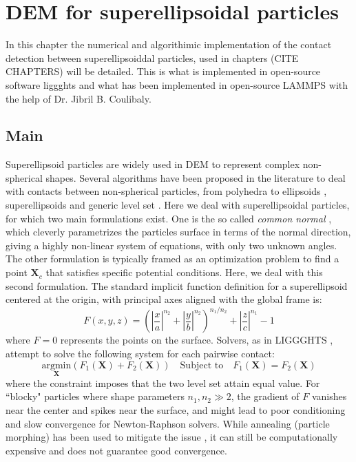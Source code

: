 \chapter{DEM for superellipsoidal particles}

In this chapter the numerical and algorithimic implementation of the contact detection between superellipsoiddal particles, used in chapters (CITE CHAPTERS) will be detailed.
This is what is implemented in open-source software liggghts and what has been implemented in open-source LAMMPS with the help of Dr. Jibril B. Coulibaly.

\section{Main}
\label{sec:superellipsoid DEM}

Superellipsoid particles are widely used in DEM to represent complex non-spherical shapes.
Several algorithms have been proposed in the literature to deal with contacts between non-spherical particles, from polyhedra \cite{} to ellipsoids \cite{}, superellipsoids \citep{zhao_polysuperellipsoidbased_2019} and generic level set \citep{kawamoto_level_2016}.
Here we deal with superellipsoidal particles, for which two main formulations exist.
One is the so called \textit{common normal} \citep{wellmann_contact_2008}, which cleverly parametrizes the particles surface in terms of the normal direction, giving a highly non-linear system of equations, with only two unknown angles. 
The other formulation \citep{houlsby_potential_2009} is typically framed as an optimization problem to find a point $\mathbf{X}_c$ that satisfies specific potential conditions.
Here, we deal with this second formulation.
The standard implicit function definition for a superellipsoid centered at the origin, with principal axes aligned with the global frame is:
\begin{equation}
F(x,y,z) = \left( \left| \frac{x}{a} \right|^{n_2} + \left| \frac{y}{b} \right|^{n_2} \right)^{n_1/n_2} + \left| \frac{z}{c} \right|^{n_1} - 1
\end{equation}
where $F=0$ represents the points on the surface. 
Solvers, as in LIGGGHTS \citep{podlozhnyuk_efficient_2016}, attempt to solve the following system for each pairwise contact:
\begin{equation}
    \underset{\mathbf{X}}{\text{argmin}} (F_1(\mathbf{X}) + F_2(\mathbf{X})) \quad \text{Subject to} \quad F_1(\mathbf{X}) = F_2(\mathbf{X})
\end{equation}
where the constraint imposes that the two level set attain equal value.
For ``blocky" particles where shape parameters $n_1, n_2 \gg 2$, the gradient of $F$ vanishes near the center and spikes near the surface, and might lead to poor conditioning and slow convergence for Newton-Raphson solvers.
While annealing (particle morphing) has been used to mitigate the issue \cite{podlozhnyuk_efficient_2016}, it can still be computationally expensive and does not guarantee good convergence.


